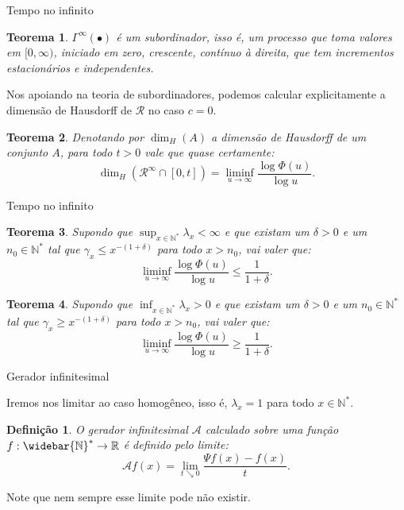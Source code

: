 \documentclass[xcolor=pdftex,dvipsnames]{beamer}
\newcommand{\AAA}{{\mathcal{A}}}
\newcommand{\RR}{{\mathcal{R}}}
\newcommand{\Nz}{{\mathbb{N^*}}}
\newcommand{\Nzb}{{\mathbb{\widebar{N}^*}}}
\newcommand{\R}{{\mathbb{R}}}
\newtheorem{teorema}{Teorema}
\newtheorem{definicao}{Definição}
\begin{document}
\begin{frame}{Tempo no infinito}

  \begin{teorema}
    $\Gamma^\infty(\bullet)$ é um subordinador, isso é, um processo
    que toma valores em $[0, \infty)$, iniciado em zero, crescente,
    contínuo à direita, que tem incrementos estacionários e
    independentes.
  \end{teorema}
  \pause
  Nos apoiando na teoria de subordinadores, podemos calcular
  explicitamente a dimensão de Hausdorff de $\RR$ no caso $c=0$.
  \begin{teorema}
    Denotando por $\dim_H (A)$ a dimensão de Hausdorff de um conjunto
    $A$, para todo $t > 0$ vale que quase certamente:
    \begin{displaymath}
      \dim_H(\RR^\infty \cap [0, t]) = 
      \liminf_{u \to \infty} \frac{\log \Phi(u)}{\log u}.
    \end{displaymath}
  \end{teorema}
\end{frame}

\begin{frame}{Tempo no infinito}

  \begin{teorema}
    Supondo que $\sup_{x\in\Nz}\lambda_x < \infty$ e que existam um
    $\delta>0$ e um $n_0 \in \Nz$ tal que $\gamma_x \leq
    x^{-(1+\delta)}$ para todo $x > n_0$, vai valer que:
    \begin{displaymath}
      \liminf_{u \to \infty} \frac{\log \Phi(u)}{\log u}  \leq
      \frac{1}{1+\delta} .
    \end{displaymath}
  \end{teorema}

  \begin{teorema}
    Supondo que $\inf_{x\in\Nz}\lambda_x > 0$ e que existam um
    $\delta>0$ e um $n_0 \in \Nz$ tal que $\gamma_x \geq
    x^{-(1+\delta)}$ para todo $x > n_0$, vai valer que:
    \begin{displaymath}
      \liminf_{u \to \infty} \frac{\log \Phi(u)}{\log u}  \geq
      \frac{1}{1+\delta} .
    \end{displaymath}
  \end{teorema}
\end{frame}



\begin{frame}{Gerador infinitesimal}

  Iremos nos limitar ao caso homogêneo, isso é, $\lambda_x = 1$ para
  todo $x \in \Nz$.

  \begin{definicao}
    O gerador infinitesimal $\AAA$ calculado sobre uma função $f: \Nzb
    \to \R$ é definido pelo limite:
    \begin{displaymath}
      \AAA f (x) = \lim_{t \searrow 0} \frac{\Psi f (x) - f(x)}{t}.
    \end{displaymath}
  \end{definicao}
  
  Note que nem sempre esse limite pode não existir.

\end{frame}  
\end{document}
